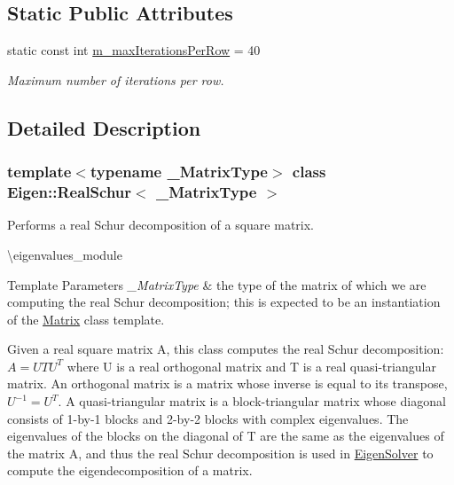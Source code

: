 \subsection*{Static Public Attributes}
\begin{DoxyCompactItemize}
\item 
static const int \mbox{\hyperlink{class_eigen_1_1_real_schur_a5cf45fb60964a3e7ea3a6718a8d7acdf}{m\+\_\+max\+Iterations\+Per\+Row}} = 40
\begin{DoxyCompactList}\small\item\em Maximum number of iterations per row. \end{DoxyCompactList}\end{DoxyCompactItemize}


\subsection{Detailed Description}
\subsubsection*{template$<$typename \+\_\+\+Matrix\+Type$>$\newline
class Eigen\+::\+Real\+Schur$<$ \+\_\+\+Matrix\+Type $>$}

Performs a real Schur decomposition of a square matrix. 

\textbackslash{}eigenvalues\+\_\+module


\begin{DoxyTemplParams}{Template Parameters}
{\em \+\_\+\+Matrix\+Type} & the type of the matrix of which we are computing the real Schur decomposition; this is expected to be an instantiation of the \mbox{\hyperlink{class_eigen_1_1_matrix}{Matrix}} class template.\\
\hline
\end{DoxyTemplParams}
Given a real square matrix A, this class computes the real Schur decomposition\+: $ A = U T U^T $ where U is a real orthogonal matrix and T is a real quasi-\/triangular matrix. An orthogonal matrix is a matrix whose inverse is equal to its transpose, $ U^{-1} = U^T $. A quasi-\/triangular matrix is a block-\/triangular matrix whose diagonal consists of 1-\/by-\/1 blocks and 2-\/by-\/2 blocks with complex eigenvalues. The eigenvalues of the blocks on the diagonal of T are the same as the eigenvalues of the matrix A, and thus the real Schur decomposition is used in \mbox{\hyperlink{class_eigen_1_1_eigen_solver}{Eigen\+Solver}} to compute the eigendecomposition of a matrix.

